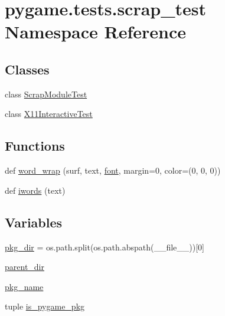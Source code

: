 \hypertarget{namespacepygame_1_1tests_1_1scrap__test}{}\section{pygame.\+tests.\+scrap\+\_\+test Namespace Reference}
\label{namespacepygame_1_1tests_1_1scrap__test}
\subsection*{Classes}
\begin{DoxyCompactItemize}
\item 
class \hyperlink{classpygame_1_1tests_1_1scrap__test_1_1_scrap_module_test}{Scrap\+Module\+Test}
\item 
class \hyperlink{classpygame_1_1tests_1_1scrap__test_1_1_x11_interactive_test}{X11\+Interactive\+Test}
\end{DoxyCompactItemize}
\subsection*{Functions}
\begin{DoxyCompactItemize}
\item 
def \hyperlink{namespacepygame_1_1tests_1_1scrap__test_ad88afac3a159075c5068758e753bb746}{word\+\_\+wrap} (surf, text, \hyperlink{namespacepygame_abb19afafd341333a96759d8d39829f0e}{font}, margin=0, color=(0, 0, 0))
\item 
def \hyperlink{namespacepygame_1_1tests_1_1scrap__test_a5f0bf84129028f7b2a71576cc68b2930}{iwords} (text)
\end{DoxyCompactItemize}
\subsection*{Variables}
\begin{DoxyCompactItemize}
\item 
\hyperlink{namespacepygame_1_1tests_1_1scrap__test_ae0217ad663578ab77cb62f5dc37d6561}{pkg\+\_\+dir} = os.\+path.\+split(os.\+path.\+abspath(\+\_\+\+\_\+file\+\_\+\+\_\+))\mbox{[}0\mbox{]}
\item 
\hyperlink{namespacepygame_1_1tests_1_1scrap__test_a3a28c45c818a591b66b932d0b409364d}{parent\+\_\+dir}
\item 
\hyperlink{namespacepygame_1_1tests_1_1scrap__test_a31e9453bde7aa6151055e8010cd9b324}{pkg\+\_\+name}
\item 
tuple \hyperlink{namespacepygame_1_1tests_1_1scrap__test_a67e93c073e77aa478323798f2bac0a3c}{is\+\_\+pygame\+\_\+pkg}
\end{DoxyCompactItemize}


